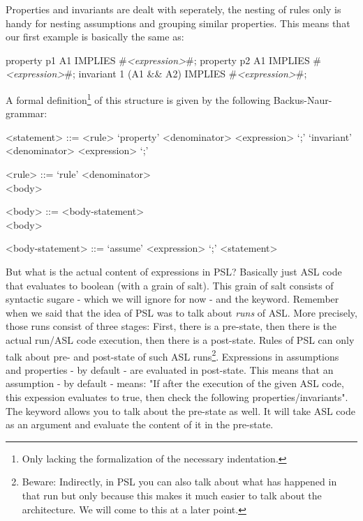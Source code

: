 \documentclass{securem}
\begin{document}
Properties and invariants are dealt with seperately, the nesting of rules only is handy for nesting assumptions and grouping similar properties.
This means that our first example is basically the same as:

\begin{psl}
property p1 A1 IMPLIES #\textit{<expression>}#;
property p2 A1 IMPLIES #\textit{<expression>}#;
invariant 1 (A1 && A2) IMPLIES #\textit{<expression>}#;
\end{psl}

A formal definition\footnote{Only lacking the formalization of the necessary indentation.} of this structure is given by the following Backus-Naur-grammar:

\begin{grammar}
    <statement> ::= <rule>
        \alt `property' <denominator> <expression> `;'
        \alt `invariant' <denominator> <expression> `;'

    <rule> ::= `rule' <denominator> \\
        <body>

    <body> ::= <body-statement>
         \\
        <body>

    <body-statement> ::= `assume' <expression> `;'
        \alt <statement>
\end{grammar}

But what is the actual content of expressions in PSL?
Basically just ASL code that evaluates to boolean (with a grain of salt).
This grain of salt consists of syntactic sugare - which we will ignore for now - and the  keyword.
Remember when we said that the idea of PSL was to talk about \textit{runs} of ASL.
More precisely, those runs consist of three stages:
First, there is a pre-state, then there is the actual run/ASL code execution, then there is a post-state.
Rules of PSL can only talk about pre- and post-state of such ASL runs\footnote{Beware: Indirectly, in PSL you can also talk about what has happened in that run but only because this makes it much easier to talk about the architecture. We will come to this at a later point.}.
Expressions in assumptions and properties - by default - are evaluated in post-state.
This means that an assumption - by default - means: "If after the execution of the given ASL code, this expession evaluates to true, then check the following properties/invariants".
The  keyword allows you to talk about the pre-state as well.
It will take ASL code as an argument and evaluate the content of it in the pre-state.
\end{document}
